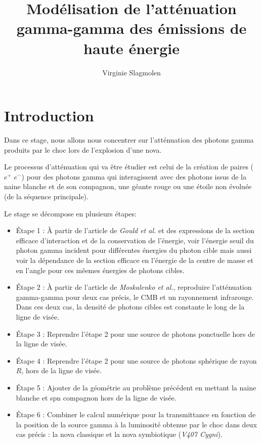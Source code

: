 \documentclass[a4paper,12pt,twoside]{article}
\title{Modélisation de l'atténuation gamma-gamma des émissions de haute énergie}
\author{Virginie Slagmolen}
\begin{document}
\thispagestyle{empty}
\maketitle
\tableofcontents
\newpage
\setcounter{page}{1}

\section*{Introduction}

Dans ce stage, nous allons nous concentrer sur l'atténuation des photons gamma produits par le choc lors de l'explosion d'une nova.

Le processus d'atténuation qui va être étudier est celui de la création de paires ($e^+$ $e^-$) pour des photons gamma qui interagissent avec des photons issus de la naine blanche et de son compagnon, une géante rouge ou une étoile non évoluée (de la séquence principale).

Le stage se décompose en plusieurs étapes:
\begin{itemize}
\item  Étape 1 : À partir de l'article de \textit{Gould et al.} et des expressions de la section efficace d'interaction et de la conservation de l'énergie, voir l'énergie seuil du photon gamma incident pour différentes énergies du photon cible mais aussi voir la dépendance de la section efficace en l'énergie de la centre de masse et en l'angle pour ces mêemes énergies de photons cibles.
\item Étape 2 :  À partir de l'article de \textit{Moskalenko et al.}, reproduire l'atténuation gamma-gamma pour deux cas précis, le CMB et un rayonnement infrarouge. Dans ces deux cas, la densité de photons cibles est constante le long de la ligne de visée.
\item Étape 3 : Reprendre l'étape 2 pour une source de photons ponctuelle hors de la ligne de visée.
\item Étape 4 : Reprendre l'étape 2 pour une source de photons sphérique de rayon $R$, hors de la ligne de visée.
\item Étape 5 : Ajouter de la géométrie au problème précédent en mettant la naine blanche et spn compagnon hors de la ligne de visée.
\item Étape 6 : Combiner le calcul numérique pour la transmittance en fonction de la position de la source gamma à la luminosité obtenue par le choc dans deux cas précis : la nova classique et la nova symbiotique (\emph{V407 Cygni}).
\end{itemize}
\newpage
\end{document}
